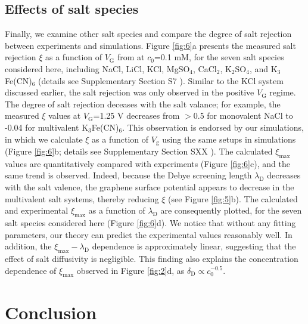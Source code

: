 \documentclass[manuscript=letter, email=true, hyperref=true, keywords=false]{achemso}
\begin{document}
\subsection{Effects of salt species}
\label{sec:salts}

Finally, we examine other salt species and compare the degree of salt
rejection between experiments and simulations. Figure \ref{fig:6}a
presents the measured salt rejection $\xi$ as a function of
$V_{\mathrm{G}}$ from at $c_{0}$=0.1 mM, for the seven salt species
considered here, including NaCl, LiCl, KCl, MgSO$_{4}$, CaCl$_{2}$,
K$_{2}$SO$_{4}$, and K$_{3}$Fe(CN)$_{6}$ (details see Supplementary
Section S7 ). Similar to the KCl system discussed
earlier, the salt rejection was only observed in the positive
$V_{\mathrm{G}}$ regime. The degree of salt rejection deceases with
the salt valance; for example, the measured $\xi$ values at
$V_{\mathrm{G}}$=1.25 V decreases from $>$0.5 for monovalent NaCl to
-0.04 for multivalent K$_{3}$Fe(CN)$_{6}$. This observation is
endorsed by our simulations, in which we calculate $\xi$ as a function
of $V_{\mathrm{g}}$ using the same setups in simulations (Figure
\ref{fig:6}b; details see Supplementary Section SXX
). The calculated $\xi_{\mathrm{max}}$ values are
quantitatively compared with experiments (Figure \ref{fig:6}c), and
the same trend is observed. Indeed, because the Debye screening length
$\lambda_{\mathrm{D}}$ decreases with the salt valence, the graphene
surface potential appears to decrease in the multivalent salt systems,
thereby reducing $\xi$ (see Figure \ref{fig:5}b). The calculated and
experimental $\xi_{\mathrm{max}}$ as a function of
$\lambda_{\mathrm{D}}$ are consequently plotted, for the seven salt
species considered here (Figure \ref{fig:6}d). We notice that without
any fitting parameters, our theory can predict the experimental values
reasonably well. In addition, the
$\xi_{\mathrm{max}}-\lambda_{\mathrm{D}}$ dependence is approximately
linear, suggesting that the effect of salt diffusivity is
negligible. This finding also explains the concentration dependence of
$\xi_{\mathrm{max}}$ observed in Figure \ref{fig:2}d, as
$\delta_{\mathrm{D}} \propto c_{0}^{-0.5}$.

\section{Conclusion}
\label{sec:consl}
\end{document}
